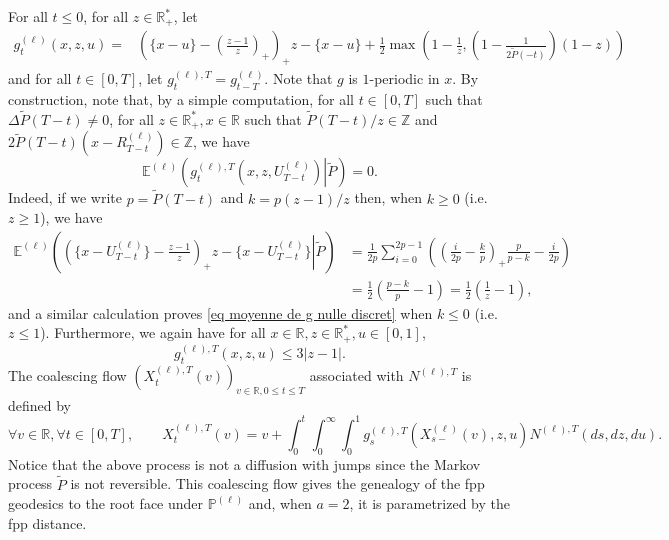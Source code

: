 \documentclass[11pt]{article}
\numberwithin{equation}{section}
\def \R{\mathbb {R}}
\def \Z{\mathbb{Z}}
\def\E{\mathbb{E}}
\def\P{\mathbb{P}}
\begin{document}
For all $t \le 0$, for all $z \in \R_+^*$, let 
\begin{align*}
g_t^{(\ell)}(x,z,u) =  &\left( \{x-u\} - \left( \frac{z-1}{z}\right)_+\right)_+ z 
- \{x-u\} +\frac{1}{2}\max\left(1-\frac{1}{z}, \left(1-\frac{1}{2\widetilde{P}(-t)} \right)(1-z) \right)
\end{align*}
and for all $t \in [0,T]$, let $g^{(\ell),T}_t = g^{(\ell)}_{t-T}$. Note that $g$ is $1$-periodic in $x$. By construction, note that, by a simple computation, for all $t\in [0,T]$ such that $\Delta \widetilde{P}(T-t)\neq 0$, for all $z \in \R^*_+, x \in \R$ such that $\widetilde{P}(T-t)/z \in \Z$ and $2 \widetilde{P}(T-t) (x- R^{(\ell)}_{T-t}) \in \Z$, we have
\begin{equation}\label{eq moyenne de g nulle discret}
	\E^{(\ell)} \left( \left. g_t^{(\ell),T}(x,z,U^{(\ell)}_{T-t}) \right\vert \widetilde{P} \right) =0.
\end{equation}
Indeed, if we write $p=\widetilde{P}(T-t)$ and $k= p(z-1)/z$ then, when $k\ge 0$ (i.e.\@ $z\ge 1$), we have
\begin{align*}
	\E^{(\ell)} \left( \left. \left(\{x-U^{(\ell)}_{T-t}\} -  \frac{z-1}{z} \right)_+ z - \{x-U^{(\ell)}_{T-t}\}\right\vert \widetilde{P} \right)&=
	\frac{1}{2p} \sum_{i=0}^{2p-1} \left(\left(\frac{i}{2p} - \frac{k}{p} \right)_+ \frac{p}{p-k} - \frac{i}{2p} \right) \\
	&= \frac{1}{2} \left( \frac{p-k}{p} -1\right) = \frac{1}{2} \left(\frac{1}{z}-1\right),
\end{align*}
and a similar calculation proves \eqref{eq moyenne de g nulle discret} when $k \le 0$ (i.e.\@ $z\le 1$).
{Furthermore}, we again have for all $x\in \R, z\in \R^*_+, u \in [0,1]$, 
\begin{equation}\label{eq majoration g discret}
	g_t^{(\ell),T}(x,z,u) \le 3 \vert z-1 \vert.
\end{equation}
The coalescing flow $(X^{(\ell),T}_t(v))_{v \in \R, 0 \le t \le T}$ associated with $N^{(\ell),T}$ is defined by
\begin{equation}\label{eq EDSdiscret}
\forall v\in \R, \forall t \in [0,T], \qquad
X^{(\ell),T}_t(v) = v + \int_0^t \int_0^\infty \int_0^1 g_s^{(\ell),T}(X^{(\ell)}_{s-}(v), z, u) N^{(\ell),T}(ds,dz,du).
\end{equation}
Notice that the above process is not a diffusion with jumps since the Markov process $\widetilde{P}$ is not reversible. This coalescing flow gives the genealogy of the fpp geodesics to the root face under $\P^{(\ell)}$ and, when $a=2$, it is parametrized by the fpp distance. 
\end{document}
